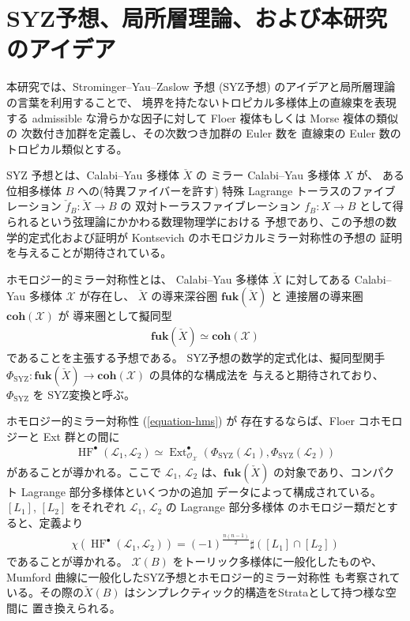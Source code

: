 \documentclass[a4paper,dvipdfmx,reqno,12pt]{amsart}
\theoremstyle{definition}
\newcommand{\opn}[1]{\operatorname{#1}}
\newcommand{\catn}[1]{\mathbf{#1}}
\numberwithin{equation}{section}
\begin{document}
\section{SYZ予想、局所層理論、および本研究のアイデア}

本研究では、Strominger--Yau--Zaslow 予想 (SYZ予想)
のアイデアと局所層理論の言葉を利用することで、
境界を持たないトロピカル多様体上の直線束を表現する 
admissible な滑らかな因子に対して
Floer 複体もしくは Morse 複体の類似の
次数付き加群を定義し、その次数つき加群の 
Euler 数を 直線束の Euler 数のトロピカル類似とする。

SYZ 予想とは、Calabi--Yau 多様体 $\check{X}$ の
ミラー Calabi--Yau 多様体 $X$ が、
ある位相多様体 $B$ への(特異ファイバーを許す)
特殊 Lagrange トーラスのファイブレーション
$\check{f}_{B}\colon \check{X}\to B$ の
双対トーラスファイブレーション $f_{B}\colon X\to B$
として得られるという弦理論にかかわる数理物理学における
予想であり、この予想の数学的定式化および証明が 
Kontsevich のホモロジカルミラー対称性の予想の
証明を与えることが期待されている。

ホモロジー的ミラー対称性とは、
Calabi--Yau 多様体 $\check{X}$ に対してある
Calabi--Yau 多様体 $\mathcal{X}$ が存在し、
$\check{X}$ の導来深谷圏 $\catn{fuk}(\check{X})$ と
連接層の導来圏 $\catn{coh}(\mathcal{X})$ が
導来圏として擬同型
\begin{align} \label{equation-hms}
\catn{fuk}(\check{X})\simeq \catn{coh}(\mathcal{X})
\end{align}
であることを主張する予想である。
SYZ予想の数学的定式化は、擬同型関手
$\Phi_{\opn{SYZ}}\colon \catn{fuk}(\check{X})
\to \catn{coh}(\mathcal{X})$ の具体的な構成法を
与えると期待されており、
$\Phi_{\opn{SYZ}}$ を SYZ変換と呼ぶ。

ホモロジー的ミラー対称性 (\ref{equation-hms}) が
存在するならば、Floer コホモロジーと Ext 群との間に
\begin{align}
\opn{HF}^{\bullet}(\mathscr{L}_1,\mathscr{L}_2)
\simeq \opn{Ext}^{\bullet}_{\mathcal{O}_{\mathcal{X}}}(\Phi_{\opn{SYZ}}(\mathscr{L}_1),
\Phi_{\opn{SYZ}}(\mathscr{L}_2))
\end{align}
があることが導かれる。ここで
$\mathscr{L}_1$, $\mathscr{L}_2$ は、$\catn{fuk}(\check{X})$
の対象であり、コンパクト Lagrange 部分多様体といくつかの追加
データによって構成されている。$[L_1]$, $[L_2]$ をそれぞれ
$\mathscr{L}_1$, $\mathscr{L}_2$ の Lagrange 部分多様体
のホモロジー類だとすると、定義より
\begin{align}
\chi(\opn{HF}^{\bullet}(\mathscr{L}_1,\mathscr{L}_2))=
(-1)^{\frac{n(n-1)}{2}} \sharp ([L_1]\cap [L_2])
\end{align}
であることが導かれる。
$\mathcal{X}(B)$ をトーリック多様体に一般化したものや、
Mumford 曲線に一般化したSYZ予想とホモロジー的ミラー対称性
も考察されている。その際の$\check{X}(B)$ 
はシンプレクティック的構造をStrataとして持つ様な空間に
置き換えられる。
\end{document}
